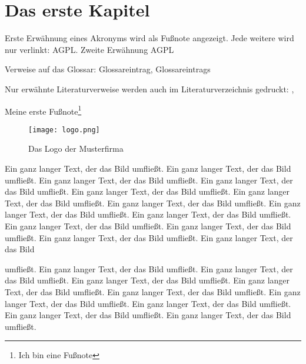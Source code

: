 
\chapter{Das erste Kapitel}
Erste Erwähnung eines Akronyms wird als Fußnote angezeigt. Jede weitere wird
nur verlinkt: \ac{AGPL}. Zweite Erwähnung \ac{AGPL}

Verweise auf das Glossar: \gls{Glossareintrag}, \glspl{Glossareintrag}

Nur erwähnte Literaturverweise werden auch im Literaturverzeichnis gedruckt:
\cite{baumgartner:2002}, \cite{dreyfus:1980}

Meine erste Fußnote\footnote{Ich bin eine Fußnote}

\begin{wrapfigure}{r}{.4\textwidth}
\texttt{[image: logo.png]}
\vspace{-15pt}
\caption{Das Logo der Musterfirma\footnotemark}
\end{wrapfigure}
Ein ganz langer Text, der das Bild umfließt. Ein ganz langer Text, der das Bild
umfließt. Ein ganz langer Text, der das Bild umfließt. Ein ganz langer Text, der
das Bild umfließt. Ein ganz langer Text, der das Bild umfließt. Ein ganz langer
Text, der das Bild umfließt. Ein ganz langer Text, der das Bild umfließt. Ein
ganz langer Text, der das Bild umfließt. Ein ganz langer Text, der das Bild
umfließt. Ein ganz langer Text, der das Bild umfließt. Ein ganz langer Text, der
das Bild umfließt. Ein ganz langer Text, der das Bild umfließt. Ein ganz langer Text, der das Bild

umfließt. Ein ganz langer Text, der das Bild umfließt. Ein ganz langer Text, der
das Bild umfließt. Ein ganz langer Text, der das Bild umfließt. Ein ganz langer
Text, der das Bild umfließt. Ein ganz langer Text, der das Bild umfließt. Ein
ganz langer Text, der das Bild umfließt. Ein ganz langer Text, der das Bild
umfließt. Ein ganz langer Text, der das Bild umfließt. Ein ganz langer Text, der
das Bild umfließt.
